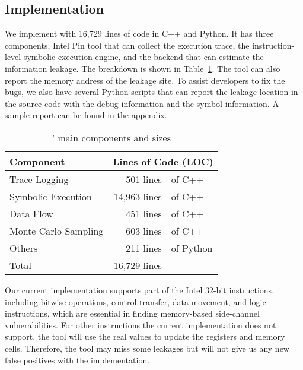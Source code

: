 \subsection{Implementation}
We implement \tool{} with 16,729 lines of code in C++ and Python. It has three
components, Intel Pin tool that can collect the execution trace, the
instruction-level symbolic execution engine, and the backend that can estimate
the information leakage. The breakdown is shown in
Table~\ref{tbl:implementation}. The tool can also report the memory address of
the leakage site. To assist developers to fix the bugs, we also have several
Python scripts that can report the leakage location in the source code with the
debug information and the symbol information. A sample report can be found in
the appendix.

\begin{table}[h]
    \centering
    \caption{\tool{}' main components and sizes}\label{tbl:implementation}
    \begin{tabular}{lr@{~}@{}l}
        \hline
        Component            & \multicolumn{2}{c}{Lines of Code (LOC)}             \\ \hline
        Trace Logging        & 501 lines                               & of C++    \\
        Symbolic Execution   & 14,963 lines                            & of C++    \\
        Data Flow            & 451 lines                               & of C++    \\
        Monte Carlo Sampling & 603 lines                               & of C++    \\
        Others               & 211 lines                               & of Python \\ \hline
        Total                & 16,729 lines                            &           \\\hline
    \end{tabular}
\end{table}

Our current implementation supports part of the Intel 32-bit instructions,
including bitwise operations, control transfer, data movement, and logic
instructions, which are essential in finding memory-based side-channel
vulnerabilities. For other instructions the current implementation does not
support, the tool will use the real values to update the registers and memory
cells. Therefore, the tool may miss some leakages but will not give us any new
false positives with the implementation.
